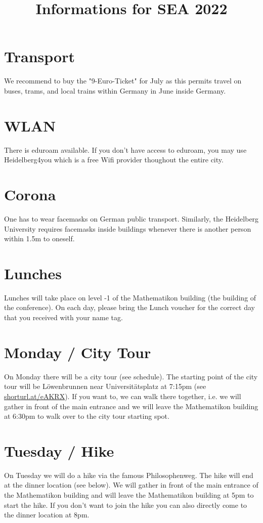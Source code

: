 \documentclass{article}
\title{Informations for SEA 2022}
\date{}
\begin{document}
\maketitle
\section{Transport}
We recommend to buy the "9-Euro-Ticket" for July as this permits travel on buses, trams, and local trains within Germany in June inside Germany. 
\section{WLAN}
There is eduroam available. If you don't have access to eduroam, you may use Heidelberg4you which is a free Wifi provider thoughout the entire city.
\section{Corona}
One has to wear facemasks on German public transport. Similarly, the Heidelberg University requires facemasks inside buildings whenever there is another person within 1.5m to oneself. 

\section{Lunches}
Lunches will take place on level -1 of the Mathematikon building (the building of the conference). On each day, please bring the Lunch voucher for the correct day that you received with your name tag.

\section{Monday / City Tour}
On Monday there will be a city tour (see schedule). The starting point of the city tour will be Löwenbrunnen near Universitätsplatz at 7:15pm (see \url{shorturl.at/eAKRX}). If you want to, we can walk there together, i.e. we will gather in front of the main entrance and we will leave the Mathematikon building at 6:30pm to walk over to the city tour starting spot. 

\section{Tuesday / Hike}

On Tuesday we will do a hike via the famous Philosophenweg. The hike will end at the dinner location (see below). We will gather in front of the main entrance of the Mathematikon building and will leave the Mathematikon building at 5pm to start the hike. If you don't want to join the hike you can also directly come to the dinner location at 8pm.
\end{document}
